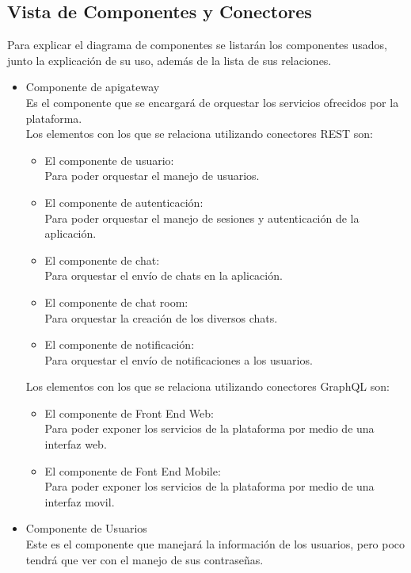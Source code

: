\subsection{Vista de Componentes y Conectores}
Para explicar el diagrama de componentes se listarán los componentes usados, junto la explicación de su uso, además de la lista de sus relaciones.
\begin{itemize}
    \item Componente de api\textunderscore gateway\\
    Es el componente que se encargará de orquestar los servicios ofrecidos por la plataforma.\\
    Los elementos con los que se relaciona utilizando conectores REST son:
    \begin{itemize}
        \item El componente de usuario:\\
        Para poder orquestar el manejo de usuarios.
        \item El componente de autenticación:\\
        Para poder orquestar el manejo de sesiones y autenticación de la aplicación.
        \item El componente de chat:\\
        Para orquestar el envío de chats en la aplicación.
        \item El componente de chat room:\\
        Para orquestar la creación de los diversos chats.
        \item El componente de notificación:\\
        Para orquestar el envío de notificaciones a los usuarios.
    \end{itemize}
    Los elementos con los que se relaciona utilizando conectores GraphQL son:
    \begin{itemize}
        \item El componente de Front End Web:\\
        Para poder exponer los servicios de la plataforma por medio de una interfaz web.
        \item El componente de Font End Mobile:\\
        Para poder exponer los servicios de la plataforma por medio de una interfaz movil.
    \end{itemize}
    \item Componente de Usuarios\\
    Este es el componente que manejará la información de los usuarios, pero poco tendrá que ver con el manejo de sus contraseñas.

\end{itemize}
